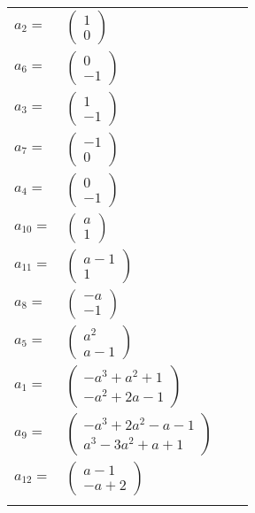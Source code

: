 \documentclass[1p]{elsarticle_modified}
\theoremstyle{definition}
\begin{document}
\begin{tabular}{m{7pt} m{180pt} m{7pt} m{180pt} }
\flushright $a_{2}=$&$\begin{pmatrix}1\\0\end{pmatrix}$ \\
\flushright $a_{6}=$&$\begin{pmatrix}0\\-1\end{pmatrix}$ \\
\flushright $a_{3}=$&$\begin{pmatrix}1\\-1\end{pmatrix}$ \\
\flushright $a_{7}=$&$\begin{pmatrix}-1\\0\end{pmatrix}$ \\
\flushright $a_{4}=$&$\begin{pmatrix}0\\-1\end{pmatrix}$ \\
\flushright $a_{10}=$&$\begin{pmatrix}a\\1\end{pmatrix}$ \\
\flushright $a_{11}=$&$\begin{pmatrix}a-1\\1\end{pmatrix}$ \\
\flushright $a_{8}=$&$\begin{pmatrix}- a\\-1\end{pmatrix}$ \\
\flushright $a_{5}=$&$\begin{pmatrix}a^2\\a-1\end{pmatrix}$ \\
\flushright $a_{1}=$&$\begin{pmatrix}- a^3+a^2+1\\- a^2+2 a-1\end{pmatrix}$ \\
\flushright $a_{9}=$&$\begin{pmatrix}- a^3+2 a^2- a-1\\a^3-3 a^2+a+1\end{pmatrix}$ \\
\flushright $a_{12}=$&$\begin{pmatrix}a-1\\- a+2\end{pmatrix}$\\&\end{tabular}
\end{document}
